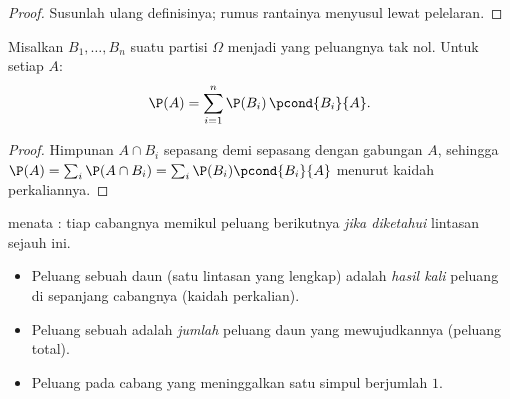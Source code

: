 \begin{proof}
Susunlah ulang definisinya; rumus rantainya menyusul lewat pelelaran.
\end{proof}

\begin{theorem}\label{thm:g12:condprob:total}
Misalkan $B_1, \dots, B_n$ suatu partisi $\Omega$ menjadi  yang peluangnya
tak nol. Untuk setiap  $A$:
\[
\P(A) = \sum_{i=1}^{n} \P(B_i)\,\pcond{B_i}{A}.
\]
\end{theorem}

\begin{proof}
Himpunan $A \cap B_i$  sepasang demi sepasang dengan gabungan $A$, sehingga
$\P(A) = \sum_i \P(A \cap B_i) = \sum_i \P(B_i)\pcond{B_i}{A}$ menurut
kaidah perkaliannya.
\end{proof}

\begin{method}\label{met:g12:condprob:tree}
 menata : tiap cabangnya memikul
peluang  berikutnya \emph{jika diketahui} lintasan sejauh ini.
\begin{itemize}
  \item Peluang sebuah daun (satu lintasan yang lengkap) adalah \emph{hasil kali}
        peluang di sepanjang cabangnya (kaidah perkalian).
  \item Peluang sebuah  adalah \emph{jumlah} peluang
        daun yang mewujudkannya (peluang total).
  \item Peluang pada cabang yang meninggalkan satu simpul berjumlah $1$.
\end{itemize}
\end{method}

